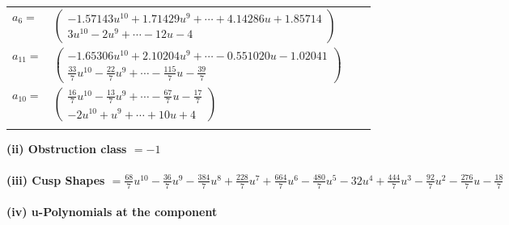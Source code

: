 \documentclass[1p]{elsarticle_modified}
\theoremstyle{definition}
\begin{document}
\begin{tabular}{m{7pt} m{180pt} m{7pt} m{180pt} }
\flushright $a_{6}=$&$\begin{pmatrix}-1.57143 u^{10}+1.71429 u^{9}+\cdots+4.14286 u+1.85714\\3 u^{10}-2 u^9+\cdots-12 u-4\end{pmatrix}$ \\
\flushright $a_{11}=$&$\begin{pmatrix}-1.65306 u^{10}+2.10204 u^{9}+\cdots-0.551020 u-1.02041\\\frac{33}{7} u^{10}-\frac{22}{7} u^9+\cdots-\frac{115}{7} u-\frac{39}{7}\end{pmatrix}$ \\
\flushright $a_{10}=$&$\begin{pmatrix}\frac{16}{7} u^{10}-\frac{13}{7} u^9+\cdots-\frac{67}{7} u-\frac{17}{7}\\-2 u^{10}+u^9+\cdots+10 u+4\end{pmatrix}$\\&\end{tabular}
\flushleft \textbf{(ii) Obstruction class $= -1$}\\~\\
\flushleft \textbf{(iii) Cusp Shapes $= \frac{68}{7} u^{10}-\frac{36}{7} u^9-\frac{384}{7} u^8+\frac{228}{7} u^7+\frac{664}{7} u^6-\frac{480}{7} u^5-32 u^4+\frac{444}{7} u^3-\frac{92}{7} u^2-\frac{276}{7} u-\frac{18}{7}$}\\~\\
\newpage\renewcommand{\arraystretch}{1}
\flushleft \textbf{(iv) u-Polynomials at the component}\newline \\
\end{document}
